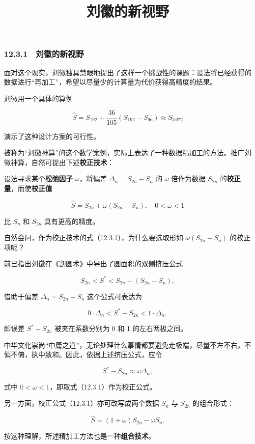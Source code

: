 \documentclass[
  10pt,
  fontset=fandol]{ctexart}
\title{刘徽的新视野}
\author{}
\date{}
\begin{document}
\maketitle

\subsubsection{12.3.1　刘徽的新视野}\label{ux5218ux5fbdux7684ux65b0ux89c6ux91ce}

面对这个现实，刘徽独具慧眼地提出了这样一个挑战性的课题：设法将已经获得的数据进行``再加工''，希望以尽量少的计算量为代价获得高精度的结果。

刘徽用一个具体的算例

\[
\widehat S=S_{192}+\frac{36}{105}(S_{192}-S_{96})\approx S_{3\,072}
\]

演示了这种设计方案的可行性。

被称为``刘徽神算''的这个数学案例，实际上表达了一种数据精加工的方法。推广刘徽神算，自然可提出下述\textbf{校正技术}：

设法寻求某个\textbf{松弛因子} \(\omega\)，将偏差 \(\Delta_n=S_{2n}-S_n\) 的 \(\omega\) 倍作为数据 \(S_{2n}\) 的\textbf{校正量}，而使\textbf{校正值}

\[
\widehat S=S_{2n}+\omega(S_{2n}-S_n),\quad 0<\omega<1
\tag{12.3.1}
\]

比 \(S_n\) 和 \(S_{2n}\) 具有更高的精度。

自然会问，作为校正技术的式（12.3.1），为什么要选取形如 \(\omega(S_{2n}-S_n)\) 的校正项呢？

前已指出刘徽在《割圆术》中导出了圆面积的双侧挤压公式

\[
S_{2n}<S^*<S_{2n}+(S_{2n}-S_n),
\]

借助于偏差 \(\Delta_n=S_{2n}-S_n\) 这个公式可表达为

\[
0\cdot\Delta_n<S^*-S_{2n}<1\cdot\Delta_n,
\]

即误差 \(S^*-S_{2n}\) 被夹在系数分别为 0 和 1 的左右两极之间。

中华文化崇尚``中庸之道''，无论处理什么事情都要避免走极端，尽量不左不右，不偏不倚，执中致和。因此，依据上述挤压公式，应令

\[
S^*-S_{2n}\approx\omega\Delta_n,
\]

式中 \(0<\omega<1\)，即取式（12.3.1）作为校正公式。

另一方面，校正公式（12.3.1）亦可改写成两个数据 \(S_n\) 与 \(S_{2n}\) 的组合形式：

\[
\widehat S=(1+\omega)S_{2n}-\omega S_n.
\]

按这种理解，所述精加工方法也是一种\textbf{组合技术}。
\end{document}
